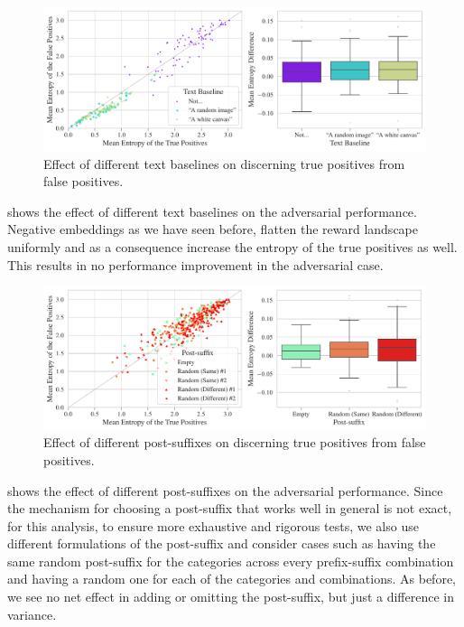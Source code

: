 \begin{figure}[H]
    \centering
    \includegraphics[width=\textwidth]{images/baseline_adversarial_2.pdf}
    \caption{Effect of different text baselines on discerning true positives from false positives.}
    \label{fig:baseline-adversarial}
\end{figure}

 shows the effect of different text baselines on the adversarial performance.
Negative embeddings as we have seen before, flatten the reward landscape uniformly and as a consequence increase the entropy of the true positives as well.
This results in no performance improvement in the adversarial case.

\begin{figure}[H]
    \centering
    \includegraphics[width=\textwidth]{images/post-suffix_adversarial_2.pdf}
    \caption{Effect of different post-suffixes on discerning true positives from false positives.}
    \label{fig:post-suffix-adversarial}
\end{figure}

 shows the effect of different post-suffixes on the adversarial performance.
Since the mechanism for choosing a post-suffix that works well in general is not exact, for this analysis, to ensure more exhaustive and rigorous tests, we also use different formulations of the post-suffix and consider cases such as having the same random post-suffix for the categories across every prefix-suffix combination and having a random one for each of the categories and combinations.
As before, we see no net effect in adding or omitting the post-suffix, but just a difference in variance.

